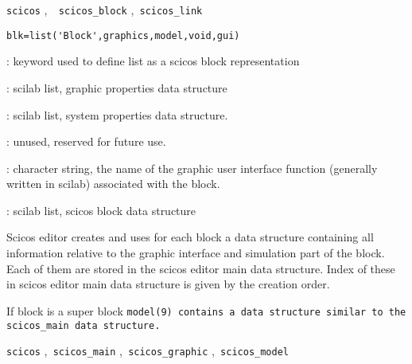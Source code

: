 {\verb?scicos?} \pageref{scicos},{\verb?  scicos_block?} \pageref{scicosblock},{\verb? scicos_link ?} \pageref{scicoslink}











%
%


\label{scicosblock}

\begin{verbatim}
blk=list('Block',graphics,model,void,gui)
\end{verbatim}
\begin{scitem}
\item[{\verb?"Block"?}]
: keyword used to define list as a scicos block representation
\item[{\verb?graphics?}]
: scilab list, graphic properties data structure
\item[{\verb?model?}]
: scilab list, system properties data structure. 

\item[{\verb?void?}]
: unused, reserved for future use.
\item[{\verb?gui?}]
: character string, the name of the graphic user interface function
(generally written in scilab) associated with the block.
\item[{\verb?blk?}]
: scilab list, scicos block data structure
\end{scitem}%
Scicos editor creates and uses for each block a data structure
containing all information relative to the graphic interface and
simulation part of the block. Each of them are stored in the scicos
editor main data structure. Index of these in scicos
editor main data structure is given by the creation order.


If block is a super block %
\tt model(9) %
\rm contains a data structure
similar to the %
\tt scicos\_main %
\rm data structure.

{\verb?scicos?} \pageref{scicos},{\verb? scicos_main?} \pageref{scicosmain},{\verb? scicos_graphic?} \pageref{scicosgraphic},{\verb? scicos_model?} \pageref{scicosmodel}









